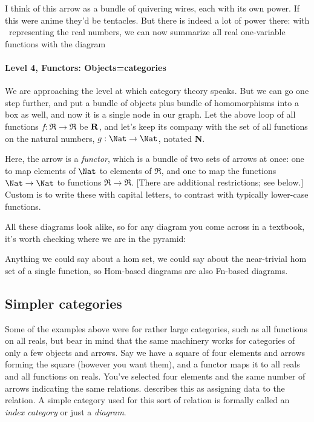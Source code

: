 \documentclass[11pt]{article}
\begin{document}
I think of this arrow as a bundle of quivering wires, each with its own power. If this were anime
they'd be tentacles. But there is indeed a lot of power there: with \Re\ representing the
real numbers, we can now summarize all real one-variable functions with the diagram 

\paragraph{Level 4, Functors: Objects=categories}
We are approaching the level at which category theory speaks. But we can go one step
further, and put a bundle of objects plus bundle of homomorphisms into a box as well, and
now it is a single node in our graph. Let the above loop of all functions $f:\Re\to\Re$
be $\bf R$, and let's keep its company with the set of all functions on the natural
numbers, $g:\Nat\to\Nat$, notated {\bf N}.


Here, the arrow is a {\em functor}, which is a bundle of two sets of arrows at once:
one to map elements of $\Nat$ to elements of $\Re$, and one to map the functions
$\Nat\to \Nat$ to functions $\Re\to \Re$. [There are additional restrictions; see
below.] Custom is to write these with capital letters, to contrast with typically
lower-case functions.

All these diagrams look alike, so for any diagram you come across in a textbook, it's
worth checking where we are in the pyramid:

Anything we could say about a hom set, we could say about the near-trivial hom
set of a single function, so Hom-based diagrams are also Fn-based diagrams.

\subsection{Simpler categories}
Some of the examples above were for rather large categories, such as all functions on all
reals, but bear in mind that the same machinery works for categories of only a few objects
and arrows. Say we have a square of four elements and arrows forming the square (however
you want them), and a functor maps it to all reals and all functions on reals. You've
selected four elements and the same number of arrows indicating the same relations.
\citet{leinster:basic} describes this as assigning data to the relation. A simple category
used for this sort of relation is formally called an {\em index category} or just a {\em diagram}. \label{diagramref}
\end{document}
